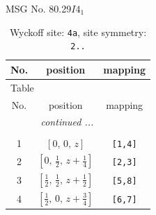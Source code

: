 \documentclass[fleqn,8pt]{jsarticle}
\begin{document}
\setcounter{MaxMatrixCols}{32}

\renewcommand{\tablename}{Table~}
\renewcommand{\figurename}{Figure~}
\begin{center}
\LARGE
MSG No. 80.29\quad$I4_{1}$
\end{center}
\renewcommand{\arraystretch}{1.2}
\begin{longtable}{ccc}
\caption{Wyckoff site: {\tt 4a}, site symmetry: {\tt 2..}}
 \\
 \hline \hline
No. & position & mapping \\ \hline \endfirsthead

\multicolumn{2}{l}{\tablename\ \thetable{}} \\
 \hline \hline
No. & position & mapping \\ \hline \endhead

 \hline \hline
\multicolumn{2}{r}{\footnotesize\it continued ...} \\ \endfoot

 \hline \hline
\multicolumn{2}{r}{} \\ \endlastfoot

1 & $\left[ 0,\, 0,\, z \right]$ & {\tt [1,4]} \\ \hline
2 & $\left[ 0,\, \frac{1}{2},\, z + \frac{1}{4} \right]$ & {\tt [2,3]} \\ \hline
3 & $\left[ \frac{1}{2},\, \frac{1}{2},\, z + \frac{1}{2} \right]$ & {\tt [5,8]} \\ \hline
4 & $\left[ \frac{1}{2},\, 0,\, z + \frac{3}{4} \right]$ & {\tt [6,7]} \\
\end{longtable}
\renewcommand{\arraystretch}{1.2}
\end{document}
